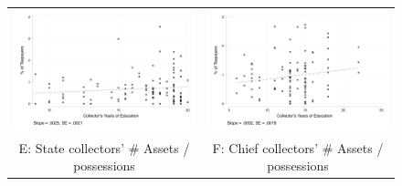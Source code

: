 \documentclass[12pt,english]{article}
\begin{document}
\begin{figure}[H]
\begin{tabular}{cc}
\includegraphics[scale=0.5]{Output/taxes_paid_DGRKOC_educ_yrs.pdf} & \includegraphics[scale=0.5]{Output/taxes_paid_chief_educ_yrs.pdf}\\
E: State collectors' \# Assets / possessions & F:  Chief collectors' \# Assets / possessions    \\

\end{tabular}
\end{figure}
\end{document}
